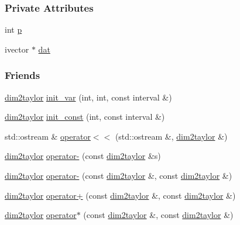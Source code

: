 \subsubsection*{\-Private \-Attributes}
\begin{DoxyCompactItemize}
\item 
int \hyperlink{classtaylor_1_1dim2taylor_a68bb1d15f4bee8bf2a437d1558c9b28b}{p}
\item 
ivector $\ast$ \hyperlink{classtaylor_1_1dim2taylor_a831423b7ae2f1d7595c7786029612942}{dat}
\end{DoxyCompactItemize}
\subsubsection*{\-Friends}
\begin{DoxyCompactItemize}
\item 
\hyperlink{classtaylor_1_1dim2taylor}{dim2taylor} \hyperlink{classtaylor_1_1dim2taylor_a8c0fa623afa0bd7232383a92323034b9}{init\-\_\-var} (int, int, const interval \&)
\item 
\hyperlink{classtaylor_1_1dim2taylor}{dim2taylor} \hyperlink{classtaylor_1_1dim2taylor_a1e38ee90f5a7748279910deb6bb5a18c}{init\-\_\-const} (int, const interval \&)
\item 
std\-::ostream \& \hyperlink{classtaylor_1_1dim2taylor_aab904a95a98e21b21ee031059cac17e8}{operator$<$$<$} (std\-::ostream \&, \hyperlink{classtaylor_1_1dim2taylor}{dim2taylor} \&)
\item 
\hyperlink{classtaylor_1_1dim2taylor}{dim2taylor} \hyperlink{classtaylor_1_1dim2taylor_a3bcec54e79e69c21c13d7172eb7f1e80}{operator-\/} (const \hyperlink{classtaylor_1_1dim2taylor}{dim2taylor} \&s)
\item 
\hyperlink{classtaylor_1_1dim2taylor}{dim2taylor} \hyperlink{classtaylor_1_1dim2taylor_acadb11c640820dd3e04df8a76df68847}{operator-\/} (const \hyperlink{classtaylor_1_1dim2taylor}{dim2taylor} \&, const \hyperlink{classtaylor_1_1dim2taylor}{dim2taylor} \&)
\item 
\hyperlink{classtaylor_1_1dim2taylor}{dim2taylor} \hyperlink{classtaylor_1_1dim2taylor_ad28973bf323c013e9b2408e545d73340}{operator+} (const \hyperlink{classtaylor_1_1dim2taylor}{dim2taylor} \&, const \hyperlink{classtaylor_1_1dim2taylor}{dim2taylor} \&)
\item 
\hyperlink{classtaylor_1_1dim2taylor}{dim2taylor} \hyperlink{classtaylor_1_1dim2taylor_a0128fad9ad560b136628b54b2db20f8a}{operator$\ast$} (const \hyperlink{classtaylor_1_1dim2taylor}{dim2taylor} \&, const \hyperlink{classtaylor_1_1dim2taylor}{dim2taylor} \&)

\end{DoxyCompactItemize}
